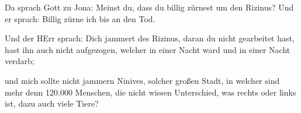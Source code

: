  Da sprach Gott zu Jona: Meinst du, dass du billig zürnest
um den Rizinus? Und er sprach: Billig zürne ich bis an den Tod.

 Und der HErr sprach: Dich jammert des Rizinus, daran du
nicht gearbeitet hast, hast ihn auch nicht aufgezogen, welcher in einer
Nacht ward und in einer Nacht verdarb;

 und mich sollte nicht jammern Ninives, solcher großen
Stadt, in welcher sind mehr denn 120.000 Menschen, die nicht wissen
Unterschied, was rechts oder links ist, dazu auch viele Tiere?
